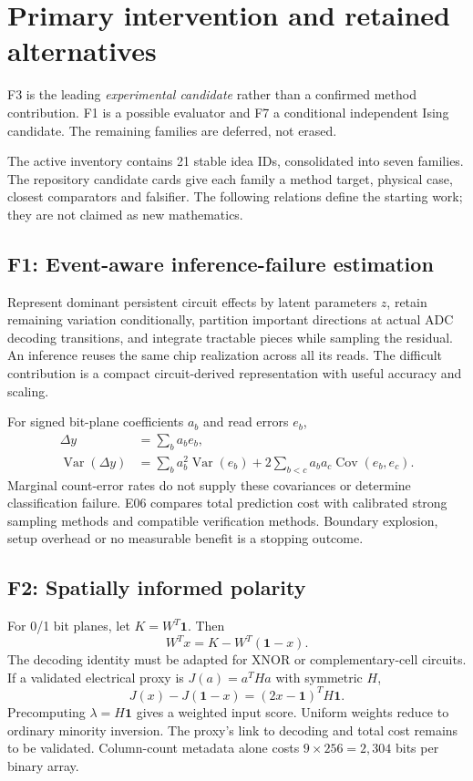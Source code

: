 \section{Primary intervention and retained alternatives}

F3 is the leading \emph{experimental candidate} rather than a confirmed method contribution.
F1 is a possible evaluator and F7 a conditional independent Ising candidate.
The remaining families are deferred, not erased.

The active inventory contains 21 stable idea IDs, consolidated into seven families.
The repository candidate cards give each family a method target, physical case, closest
comparators and falsifier. The following relations define the starting work; they are
not claimed as new mathematics.

\subsection{F1: Event-aware inference-failure estimation}

Represent dominant persistent circuit effects by latent parameters $z$, retain remaining
variation conditionally, partition important directions at actual ADC decoding transitions,
and integrate tractable pieces while sampling the residual. An inference reuses the same
chip realization across all its reads. The difficult contribution is a compact
circuit-derived representation with useful accuracy and scaling.

For signed bit-plane coefficients $a_b$ and read errors $e_b$,
\begin{align}
\Delta y &= \sum_b a_b e_b,\\
\operatorname{Var}(\Delta y)&=\sum_b a_b^2\operatorname{Var}(e_b)
 +2\sum_{b<c}a_ba_c\operatorname{Cov}(e_b,e_c).
\end{align}
Marginal count-error rates do not supply these covariances or determine classification
failure. E06 compares total prediction cost with calibrated strong sampling methods and
compatible verification methods. Boundary explosion, setup overhead or no measurable
benefit is a stopping outcome.

\subsection{F2: Spatially informed polarity}

For 0/1 bit planes, let $K=W^T\mathbf1$. Then
\begin{equation}
 W^Tx=K-W^T(\mathbf1-x).
\end{equation}
The decoding identity must be adapted for XNOR or complementary-cell circuits. If a
validated electrical proxy is $J(a)=a^THa$ with symmetric $H$,
\begin{equation}
 J(x)-J(\mathbf1-x)=(2x-\mathbf1)^TH\mathbf1.
\end{equation}
Precomputing $\lambda=H\mathbf1$ gives a weighted input score. Uniform weights reduce to
ordinary minority inversion. The proxy's link to decoding and total cost remains to be
validated. Column-count metadata alone costs $9\times256=2{,}304$ bits per binary array.

